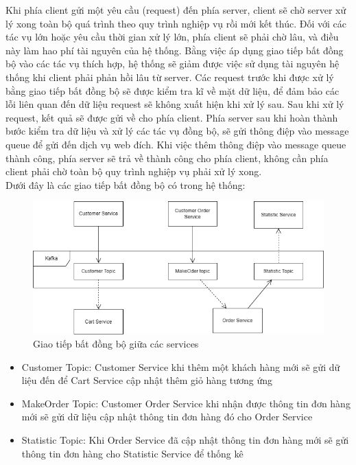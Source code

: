 \par Khi phía client gửi một yêu cầu (request) đến phía server, client sẽ chờ server xử lý xong toàn bộ quá trình theo quy trình nghiệp vụ rồi mới kết thúc.
Đối với các tác vụ lớn hoặc yêu cầu thời gian xử lý lớn, phía client sẽ phải chờ lâu, và điều này làm hao phí tài nguyên của hệ thống. Bằng việc áp dụng giao tiếp bất đồng bộ vào các tác vụ thích hợp, hệ thống sẽ giảm được việc sử dụng tài nguyên hệ thống khi client phải phản hồi lâu từ server.
Các request trước khi được xử lý bằng giao tiếp bất đồng bộ sẽ được kiểm tra kĩ về mặt dữ liệu, để đảm bảo các lỗi liên quan đến dữ liệu request sẽ không xuất hiện khi xử lý sau. Sau khi xử lý request, kết quả sẽ được gửi về cho phía client.
Phía server sau khi hoàn thành bước kiểm tra dữ liệu và xử lý các tác vụ đồng bộ, sẽ gửi thông điệp vào message queue để gửi đến dịch vụ web đích. Khi việc thêm thông điệp vào message queue thành công, phía server sẽ trả về thành công cho phía client, không cần phía client phải chờ toàn bộ quy trình nghiệp vụ phải xử lý xong.\\
 
Dưới đây là các giao tiếp bất đồng bộ có trong hệ thống:
 
\begin{figure}[!htp]
    \centering
    \includegraphics[width=13cm]{img/Architecture/kafka.png}
    \newline
    \caption{Giao tiếp bất đồng bộ giữa các services}
\end{figure}
 
\begin{itemize}
    \item Customer Topic: Customer Service khi thêm một khách hàng mới sẽ gửi dữ liệu đến để Cart Service cập nhật thêm giỏ hàng tương ứng
    \item MakeOrder Topic: Customer Order Service khi nhận được thông tin đơn hàng mới sẽ gửi dữ liệu cập nhật thông tin đơn hàng đó cho Order Service
    \item Statistic Topic: Khi Order Service đã cập nhật thông tin đơn hàng mới sẽ gửi thông tin đơn hàng cho Statistic Service để thống kê
\end{itemize}